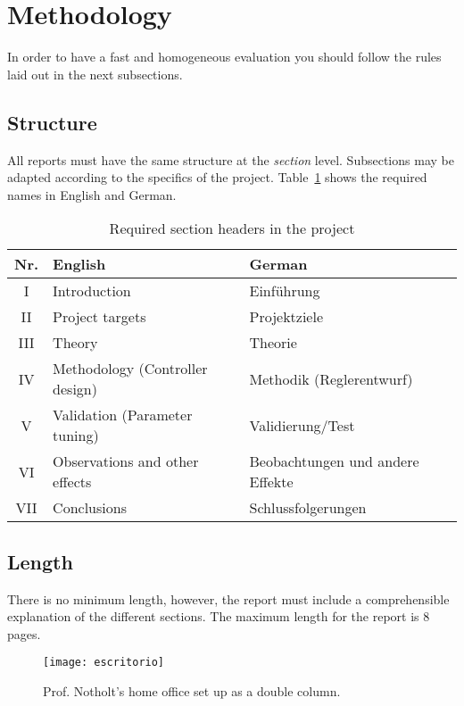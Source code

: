	\section{Methodology} 
	
	In order to have a fast and homogeneous evaluation you should follow the rules laid out in the next subsections.
	
	\subsection{Structure}
	
	All reports must have the same structure at the \emph{section} level. Subsections may be adapted according to the specifics of the project. Table~\ref{tbl:sections} shows the required names in English and German.
	
	\begin{table}[hb]
		\caption{Required section headers in the project}\label{tbl:sections}
		\centering
		\begin{tabular}{cp{12em}p{12em}}
			\hline
			\bfseries Nr. & \bfseries English & \bfseries German\\
			\hline
			I & Introduction & Einführung\\
			II & Project targets & Projektziele \\
			III & Theory & Theorie \\
			IV & Methodology (Controller design) & Methodik (Reglerentwurf)\\
			V & Validation (Parameter tuning) & Validierung/Test \\
			VI & Observations and other effects & Beobachtungen und andere Effekte\\
			VII & Conclusions & Schlussfolgerungen\\
			\hline
		\end{tabular}
	\end{table}
	

	\subsection{Length}
	
	There is no minimum length, however, the report must include a comprehensible explanation of the different sections. The maximum length for the report is 8 pages.
	
	\begin{figure*}[hbt]
		\texttt{[image: escritorio]}
		\caption{Prof. Notholt's home office set up as a double column.}\label{fig:doublecolumn}
	\end{figure*}
	
